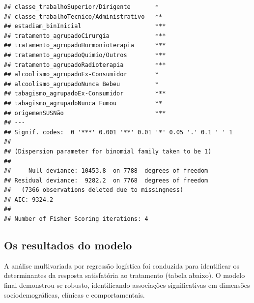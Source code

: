 \documentclass[
]{article}
\begin{document}
\begin{verbatim}
## classe_trabalhoSuperior/Dirigente       *  
## classe_trabalhoTecnico/Administrativo   ** 
## estadiam_binInicial                     ***
## tratamento_agrupadoCirurgia             ***
## tratamento_agrupadoHormonioterapia      ***
## tratamento_agrupadoQuimio/Outros        ***
## tratamento_agrupadoRadioterapia         ***
## alcoolismo_agrupadoEx-Consumidor        *  
## alcoolismo_agrupadoNunca Bebeu          *  
## tabagismo_agrupadoEx-Consumidor         ***
## tabagismo_agrupadoNunca Fumou           ** 
## origemenSUSNão                          ***
## ---
## Signif. codes:  0 '***' 0.001 '**' 0.01 '*' 0.05 '.' 0.1 ' ' 1
## 
## (Dispersion parameter for binomial family taken to be 1)
## 
##     Null deviance: 10453.8  on 7788  degrees of freedom
## Residual deviance:  9282.2  on 7768  degrees of freedom
##   (7366 observations deleted due to missingness)
## AIC: 9324.2
## 
## Number of Fisher Scoring iterations: 4
\end{verbatim}

\subsection{Os resultados do modelo}\label{os-resultados-do-modelo}

A análise multivariada por regressão logística foi conduzida para
identificar os determinantes da resposta satisfatória ao tratamento
(tabela abaixo). O modelo final demonstrou-se robusto, identificando
associações significativas em dimensões sociodemográficas, clínicas e
comportamentais.
\end{document}

